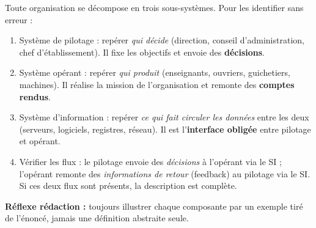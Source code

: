 \documentclass[11pt]{article}
\newcommand{\cle}[1]{{\popxbold\color{popdark}#1}}
\begin{document}
\begin{methode}
Toute organisation se décompose en trois sous-systèmes. Pour les identifier sans erreur :
\begin{enumerate}
  \item \cle{Système de pilotage} : repérer \emph{qui décide} (direction, conseil d'administration, chef d'établissement). Il fixe les objectifs et envoie des \textbf{décisions}.
  \item \cle{Système opérant} : repérer \emph{qui produit} (enseignants, ouvriers, guichetiers, machines). Il réalise la mission de l'organisation et remonte des \textbf{comptes rendus}.
  \item \cle{Système d'information} : repérer \emph{ce qui fait circuler les données} entre les deux (serveurs, logiciels, registres, réseau). Il est l'\textbf{interface obligée} entre pilotage et opérant.
  \item \cle{Vérifier les flux} : le pilotage envoie des \emph{décisions} à l'opérant via le SI ; l'opérant remonte des \emph{informations de retour} (feedback) au pilotage via le SI. Si ces deux flux sont présents, la description est complète.
\end{enumerate}
\textbf{Réflexe rédaction :} toujours illustrer chaque composante par un exemple tiré de l'énoncé, jamais une définition abstraite seule.
\end{methode}
\end{document}
